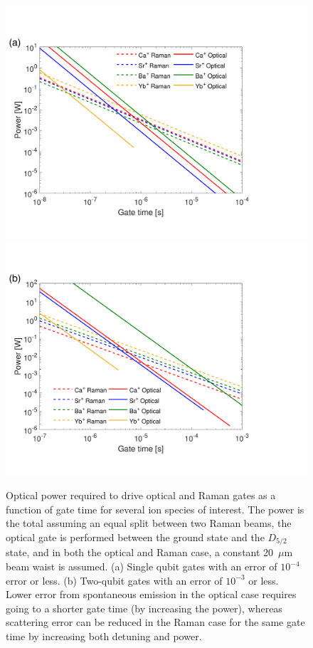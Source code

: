\documentclass[%
12pt,
 amsmath,amssymb,
]{revtex4-2}
\begin{document}
\begin{figure}[tp]
\includegraphics[scale=.5]{gate_comp_1qg_v5.pdf}\\
\includegraphics[scale=.5]{gate_comp_2qg_v5.pdf}
\caption{Optical power required to drive optical and Raman gates as a function of gate time for several ion species of interest.  The power is the total assuming an equal split between two Raman beams, the optical gate is performed between the ground state and the $D_{5/2}$ state, and in both the optical and Raman case, a constant 20~$\mu$m beam waist is assumed.  (a) Single qubit gates with an error of $10^{-4}$ error or less. (b) Two-qubit gates with an error of $10^{-3}$ or less.  Lower error from spontaneous emission in the optical case requires going to a shorter gate time (by increasing the power), whereas scattering error can be reduced in the Raman case for the same gate time by increasing both detuning and power.}
\label{fig:gate_comparison}
\end{figure}
\end{document}
